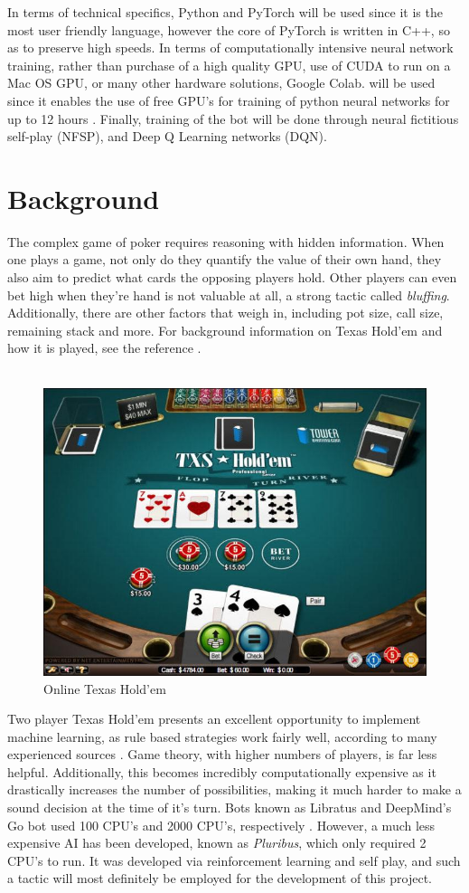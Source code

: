 \documentclass[12pt]{article}
\begin{document}
In terms of technical specifics, Python and PyTorch will be used since it is the most user friendly language, however the core of PyTorch is written in C++, so as to preserve high speeds. In terms of computationally intensive neural network training, rather than purchase of a high quality GPU, use of CUDA to run on a Mac OS GPU, or many other hardware solutions, Google Colab. will be used since it enables the use of free GPU's for training of python neural networks for up to 12 hours \cite{colab}. Finally, training of the bot will be done through neural fictitious self-play (NFSP), and Deep Q Learning networks (DQN).

\newpage
\tableofcontents
\listoffigures
\newpage

\section{Background}
The complex game of poker requires reasoning with hidden information. When one plays a game, not only do they quantify the value of their own hand, they also aim to predict what cards the opposing players hold. Other players can even bet high when they're hand is not valuable at all, a strong tactic called \textit{bluffing}. Additionally, there are other factors that weigh in, including pot size, call size, remaining stack and more. For background information on Texas Hold'em and how it is played, see the reference \cite{tex}.\\\\
\begin{figure}[H]
    \centering
    \includegraphics[width=.70\linewidth]{figures/texas.jpg}
    \caption{Online Texas Hold'em}
    \label{fig:tex}
\end{figure}
Two player Texas Hold'em presents an excellent opportunity to implement machine learning, as rule based strategies work fairly well, according to many experienced sources \cite{ai}. Game theory, with higher numbers of players, is far less helpful. Additionally, this becomes incredibly computationally expensive as it drastically increases the number of possibilities, making it much harder to make a sound decision at the time of it's turn. Bots known as Libratus and DeepMind's Go bot used 100 CPU's and 2000 CPU's, respectively \cite{ai}. However, a much less expensive AI has been developed, known as \textit{Pluribus}, which only required 2 CPU's to run. It was developed via reinforcement learning and self play, and such a tactic will most definitely be employed for the development of this project. 
\end{document}
